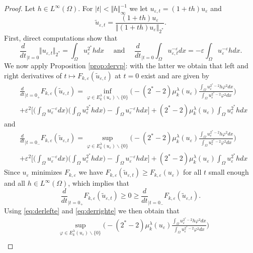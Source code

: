 \documentclass[10pt]{amsart}
\numberwithin{equation}{section}
\newcommand{\ve}{\varepsilon}
\newcommand{\vp}{\varphi}
\newcommand{\Om}{\Omega}
\newcommand{\mkl}{\mu_{k}^{\lambda}}
\newcommand{\Fke}{F_{k,\ve}}
\theoremstyle{plain}
\theoremstyle{remark}
\begin{document}
\begin{proof}
Let $h \in L^\infty(\Om)$. For $|t| < \Vert h \Vert_{\infty}^{-1}$ we let $u_{\ve,t} = (1+th)u_\ve$ and 
$$ \tilde{u}_{\ve,t} = \frac{(1+th)u_\ve}{\Vert (1+th)u_\ve\Vert_{2^*}}.$$
First, direct computations show that 
$$ \frac{d}{dt}_{|t = 0} \Vert u_{\ve,t} \Vert_{2^*} = \int_{\Om} u_\ve^{2^*}h dx \quad \text{ and } \quad  \frac{d}{dt}_{|t = 0} \int_{\Om} u_{\ve,t}^{-\ve}dx =- \ve \int_{\Om}u_\ve^{-\ve}h dx. $$
We now apply Proposition \ref{prop:dervp}: with the latter we obtain that left and right derivatives of $t \mapsto \Fke(\tilde{u}_{\ve,t})$ at $t=0$ exist and are given by 
\begin{equation} \label{eq:derlefte}
\begin{aligned}
& \frac{d}{dt}_{|t=0_+} \Fke(\tilde{u}_{\ve,t}) = \inf_{\vp \in E_k^{\lambda}(u_\ve)\backslash \{0\}} \Bigg( - (2^*-2) \mkl(u_\ve) \frac{\int_\Om u_\ve^{2^*-2}h \vp^2dx}{\int_\Om u_\ve^{2^*-2} \vp^2 dx}\Bigg) \\
& + \ve^2 \Big[ \Big(\int_\Om u_\ve^{-\ve}dx\Big)\Big( \int_{\Om} u_\ve^{2^*}h dx\Big) - \int_{\Om} u_\ve^{-\ve}h dx\Big] + (2^*-2)\mkl(u_\ve)\int_{\Om} u_\ve^{2^*}h dx
\end{aligned}
\end{equation}
and
\begin{equation} \label{eq:derrighte}
\begin{aligned}
& \frac{d}{dt}_{|t=0_-} \Fke(\tilde{u}_{\ve,t}) = \sup_{\vp \in E_k^{\lambda}(u_\ve)\backslash \{0\}} \Bigg( - (2^*-2) \mkl(u_\ve) \frac{\int_\Om u_\ve^{2^*-2}h \vp^2dx}{\int_\Om u_\ve^{2^*-2} \vp^2 dx}\Bigg) \\
& + \ve^2 \Big[ \Big(\int_\Om u_\ve^{-\ve}dx\Big) \Big(\int_{\Om} u_\ve^{2^*}h dx\Big) - \int_{\Om} u_\ve^{-\ve}h dx\Big] + (2^*-2)\mkl(u_\ve)\int_{\Om} u_\ve^{2^*}h dx
\end{aligned}
\end{equation}
Since $u_\ve$ minimizes $F_{k,\ve}$ we have $ \Fke(\tilde{u}_{\ve,t}) \ge \Fke(u_\ve)$ for all $t$ small enough and all $h \in L^\infty(\Omega)$, which implies that
\begin{equation} \label{eq:extremale}
  \frac{d}{dt}_{|t=0_+} \Fke(\tilde{u}_{\ve,t})  \ge 0 \ge  \frac{d}{dt}_{|t=0_-} \Fke(\tilde{u}_{\ve,t}). 
  \end{equation}
Using \eqref{eq:derlefte} and \eqref{eq:derrighte} we then obtain that 
\begin{equation} \label{eq:dim1}
\begin{aligned}
&  \sup_{\vp \in E_k^{\lambda}(u_\ve)\backslash \{0\}} \Bigg( - (2^*-2) \mkl(u_\ve) \frac{\int_\Om u_\ve^{2^*-2}h \vp^2dx}{\int_\Om u_\ve^{2^*-2} \vp^2 dx}\Bigg) \\

\end{aligned}
\end{equation}
\end{proof}
\end{document}
